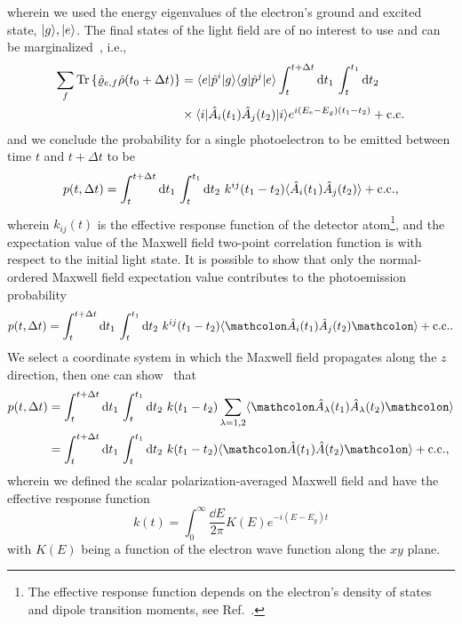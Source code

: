 wherein we used the energy eigenvalues of the electron's ground and excited state, $\lvert g\rangle,\lvert e\rangle$.
The final states of the light field are of no interest to use and can be marginalized~\cite[p.~694]{Mandel1995}, i.e.,
\begin{equation}
	\begin{split}
		\sum_f
		\trace\left\{
			\hat\varrho_{e,f}
			\hat\rho(t_0+\Delta t)
		\right\}
		&=
		\bra{e}\hat{p}^i\ket{g}
		\bra{g}\hat{p}^j\ket{e}
		\int_t^{t+\Delta t}\dd{t_1}
		\int_t^{t_1}
		\dd{t_2}
		\\
		&\times
		\bra{i}
			\hat{A}_i(t_1)
			\hat{A}_j(t_2)
		\ket{i}
		e^{i(E_e-E_g)(t_1-t_2)}
		+
		\text{c.c.}
	\end{split}	
\end{equation}
and we conclude the probability for a single photoelectron to be emitted between time $t$ and $t+\Delta t$ to be
\begin{equation}
	p(t,\Delta t)
	=
	\int_t^{t+\Delta t}\dd{t_1}
	\int_t^{t_1}
	\dd{t_2}
	k^{ij}(t_1-t_2)
	\expval{
		\hat{A}_i(t_1)
		\hat{A}_j(t_2)
	}
	+
	\text{c.c.}
	,
\end{equation}
wherein $k_{ij}(t)$ is the effective response function of the detector atom\footnote{The effective response function depends on the electron's density of states and dipole transition moments, see Ref.~\cite[p.~694]{Mandel1995}.}, and the expectation value of the Maxwell field two-point correlation function is with respect to the initial light state.
It is possible to show that only the normal-ordered Maxwell field expectation value contributes to the photoemission probability~\cite[p.~696]{Mandel1995}
\begin{equation}
	p(t,\Delta t)
	=
	\int_t^{t+\Delta t}\dd{t_1}
	\int_t^{t_1}
	\dd{t_2}
	k^{ij}(t_1-t_2)
	\expval{
		\norder{
			\hat{A}_i(t_1)
			\hat{A}_j(t_2)
		}
	}
	+
	\text{c.c.}
	.	
\end{equation}
We select a coordinate system in which the Maxwell field propagates along the $z$ direction, then one can show~\cite{Kimble1984} that
\begin{equation}
	\begin{split}
		p(t,\Delta t)
		&=
		\int_t^{t+\Delta t}\dd{t_1}
		\int_t^{t_1}
		\dd{t_2}
		k(t_1-t_2)
		\sum_{\lambda=1,2}
		\expval{
			\norder{
				\hat{A}_\lambda(t_1)
				\hat{A}_\lambda(t_2)
			}
		}
		\\
		&=
		\int_t^{t+\Delta t}\dd{t_1}
		\int_t^{t_1}
		\dd{t_2}
		k(t_1-t_2)
		\expval{
			\norder{
				\hat{A}(t_1)
				\hat{A}(t_2)
			}
		}
		+
		\text{c.c.}
		,
	\end{split}
\end{equation}
wherein we defined the scalar polarization-averaged Maxwell field and have the effective response function
\begin{equation}
	k(t)
	=
	\int_0^\infty\frac{\dd{E}}{2\pi}
	K(E)
	e^{-i(E-E_g)t}
\end{equation}
with $K(E)$ being a function of the electron wave function along the $xy$ plane.

